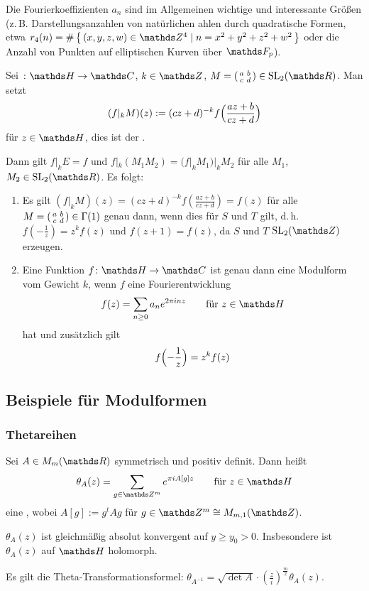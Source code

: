 \begin{beme}
	Die Fourierkoeffizienten $a_n$ sind im Allgemeinen wichtige und interessante Größen (z.\,B. Darstellungsanzahlen von natürlichen ahlen durch quadratische Formen, etwa $r_4(n) = \#\Set{(x,y,z,w) \in \ZZ^4 \mid n = x^2+y^2+z^2+w^2}$ oder die Anzahl von Punkten auf elliptischen Kurven über $\FF_p$).
\end{beme}

\begin{defi}
	Sei $\colon \HH \ra \CC$, $k\in\ZZ$, $M = \abcd \in \SL_2(\RR)$.
	Man setzt
	\[
		(f|_kM)(z) := (cz+d)^{-k} f\Bigl(\frac{az+b}{cz+d}\Bigr)
	\]
	für $z\in\HH$, dies ist der .
\end{defi}

Dann gilt $f|_kE = f$ und $f|_k(M_1M_2) = (f|_kM_1)|_kM_2$ für alle $M_1$, $M_2 \in \SL_2(\RR)$.
Es folgt:
\begin{enumerate}
	\item Es gilt $(f|_kM)(z) = (cz+d)^{-k} f(\frac{az+b}{cz+d}) = f(z)$ für alle $M = \abcd \in \Gamma(1)$ genau dann, wenn dies für $S$ und $T$ gilt, d.\,h. $f(-\frac{1}{z}) = z^k f(z)$ und $f(z+1) = f(z)$, da $S$ und $T$ $\SL_2(\ZZ)$ erzeugen.
	\item Eine Funktion $f\colon \HH \ra \CC$ ist genau dann eine Modulform vom Gewicht $k$, wenn $f$ eine Fourierentwicklung
	\[
		f(z) = \sum_{n \geq 0} a_n e^{2\pi inz}
		\qquad \text{für }
		z \in \HH
	\]
	hat und zusätzlich gilt
	\[
		f\Bigl(-\frac{1}{z}\Bigr) = z^k f(z)
	\]
\end{enumerate}

\subsection{Beispiele für Modulformen}

\subsubsection{Thetareihen}

\begin{defi}
	Sei $A \in M_m(\RR)$ symmetrisch und positiv definit.
	Dann heißt
	\[
		\theta_A(z) = \sum_{g \in \ZZ^m} e^{\pi i A[g]z}
		\qquad \text{für }
		z \in \HH
	\]
	eine , wobei $A[g] := g^t A g$ für $g \in \ZZ^m \cong M_{m,1}(\ZZ)$.
\end{defi}

\begin{satz-list}
	\item $\theta_A(z)$ ist gleichmäßig absolut konvergent auf $y \geq y_0 > 0$.
	Insbesondere ist $\theta_A(z)$ auf $\HH$ holomorph.
	\item Es gilt die Theta-Transformationsformel: $\theta_{A^{-1}} = \sqrt{\det A} \cdot (\frac{z}{i})^{\frac{m}{2}} \theta_A(z)$.
\end{satz-list}

